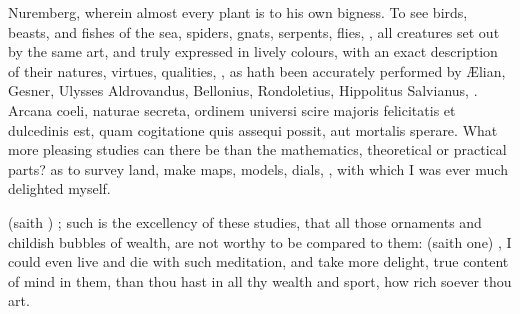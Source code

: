 {Nuremberg, wherein almost every plant is to his own bigness. To see
birds, beasts, and fishes of the sea, spiders, gnats, serpents, flies,
\etc{}, all creatures set out by the same art, and truly expressed in
lively colours, with an exact description of their natures, virtues,
qualities, \etc{}, as hath been accurately performed by \AE{}lian, Gesner,
Ulysses Aldrovandus, Bellonius, Rondoletius, Hippolitus Salvianus, \etc{}.
Arcana coeli, naturae secreta, ordinem universi scire majoris
felicitatis et dulcedinis est, quam cogitatione quis assequi possit,
aut mortalis sperare. What more pleasing studies can there be than the
mathematics, theoretical or practical parts? as to survey land, make
maps, models, dials, \etc{}, with which I was ever much delighted myself.

 (saith  \Plutarch) ; such is the excellency of these studies, that all
those ornaments and childish bubbles of wealth, are not worthy to be
compared to them:  (saith one) , I could even live and die with such
meditation, and take more delight, true content of mind in them,
than thou hast in all thy wealth and sport, how rich soever thou art.

}
